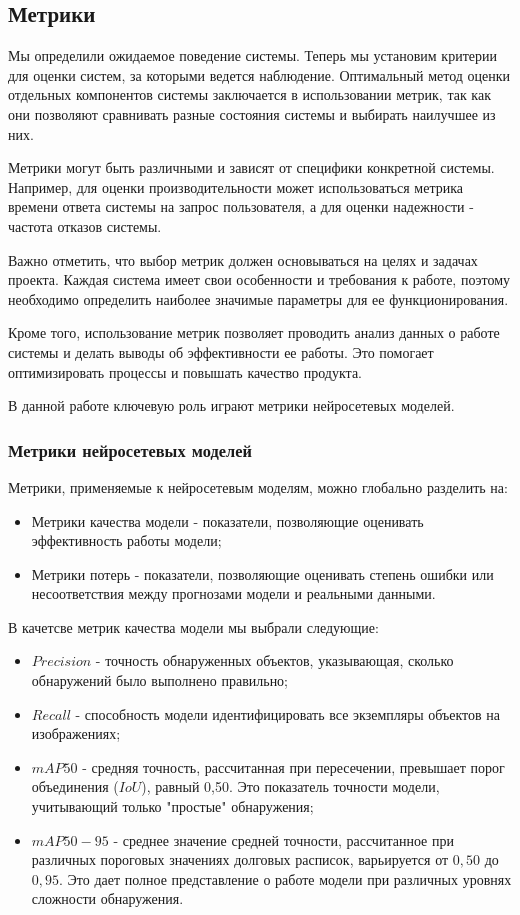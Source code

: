 \subsection{Метрики}
Мы определили ожидаемое поведение системы. Теперь мы установим критерии для оценки систем, за которыми ведется наблюдение. Оптимальный метод оценки отдельных компонентов системы заключается в использовании метрик, так как они позволяют сравнивать разные состояния системы и выбирать наилучшее из них.

Метрики могут быть различными и зависят от специфики конкретной системы. Например, для оценки производительности может использоваться метрика времени ответа системы на запрос пользователя, а для оценки надежности - частота отказов системы.

Важно отметить, что выбор метрик должен основываться на целях и задачах проекта. Каждая система имеет свои особенности и требования к работе, поэтому необходимо определить наиболее значимые параметры для ее функционирования.

Кроме того, использование метрик позволяет проводить анализ данных о работе системы и делать выводы об эффективности ее работы. Это помогает оптимизировать процессы и повышать качество продукта.

В данной работе ключевую роль играют метрики нейросетевых моделей.

\subsubsection{Метрики нейросетевых моделей}

Метрики, применяемые к нейросетевым моделям, можно глобально разделить на:
\begin{itemize}
    \item Метрики качества модели - показатели, позволяющие оценивать эффективность работы модели;
    \item Метрики потерь - показатели, позволяющие оценивать степень ошибки или несоответствия между прогнозами модели и реальными данными.
\end{itemize}

В качетсве метрик качества модели мы выбрали следующие:

\begin{itemize}
    \item $Precision$ - точность обнаруженных объектов, указывающая, сколько обнаружений было выполнено правильно;
    \item $Recall$ - способность модели идентифицировать все экземпляры объектов на изображениях;
    \item $mAP50$ - средняя точность, рассчитанная при пересечении, превышает порог объединения ($IoU$), равный 0,50. Это показатель точности модели, учитывающий только "простые" обнаружения;
    \item $mAP50-95$ - среднее значение средней точности, рассчитанное при различных пороговых значениях долговых расписок, варьируется от $0,50$ до $0,95$. Это дает полное представление о работе модели при различных уровнях сложности обнаружения.
\end{itemize}

